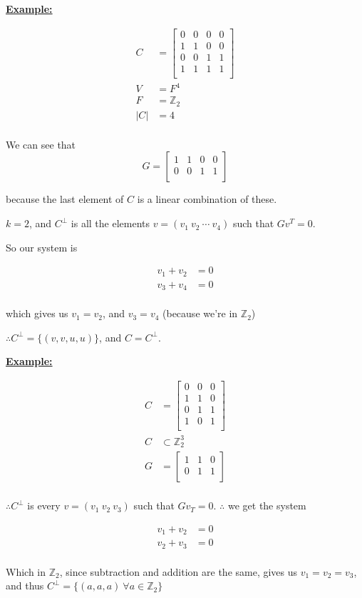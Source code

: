 \documentclass{article}
\renewcommand{\b}[1]{\textbf{#1}}
\newcommand{\ul}[1]{\underline{#1}}
\renewcommand{\aligned}[1]{
	\begin{align*}
		#1
	\end{align*}
}
\newcommand{\newdef}[2]{\b{\ul{#1:}} #2}
\begin{document}
\newdef{Example}{
	\aligned{
		C   & = \begin{bmatrix}
			0 & 0 & 0 & 0 \\
			1 & 1 & 0 & 0 \\
			0 & 0 & 1 & 1 \\
			1 & 1 & 1 & 1 \\
		\end{bmatrix} \\
		V   & = F^4                        \\
		F   & = \mathbb{Z}_2               \\
		|C| & = 4                          \\
	}

	We can see that
	\[G = \begin{bmatrix}
			1 & 1 & 0 & 0 \\
			0 & 0 & 1 & 1 \\
		\end{bmatrix}\]

	because the last element of $C$ is a linear combination of these.

	$k = 2$, and $C^\perp$ is all the elements
	$v = (v_1\ v_2\ \cdots\ v_4)$ such that $Gv^T = 0$.

	So our system is
	\aligned {
		v_1 + v_2 & = 0 \\
		v_3 + v_4 & = 0 \\
	}

	which gives us $v_1 = v_2$, and $v_3 = v_4$ (because we're in
	$\mathbb{Z}_2$)

	$\therefore C^\perp = \{(v,v, u, u)\}$, and $C = C^\perp$.
}

\newdef{Example}{
	\aligned {
		C & = \begin{bmatrix}
			0 & 0 & 0 \\
			1 & 1 & 0 \\
			0 & 1 & 1 \\
			1 & 0 & 1 \\
		\end{bmatrix} \\
		C & \subset \mathbb{Z}^3_2       \\
		G & = \begin{bmatrix}
			1 & 1 & 0 \\
			0 & 1 & 1 \\
		\end{bmatrix} \\
	}

	$\therefore C^\perp$ is every $v = (v_1\ v_2\ v_3)$ such that
	$Gv_T = 0$. $\therefore$ we get the system
	\aligned {
		v_1 + v_2 & = 0 \\
		v_2 + v_3 & =0  \\
	}
	Which in $\mathbb{Z}_2$, since subtraction and addition are the same,
	gives us $v_1 = v_2 = v_3$, and thus
	$C^\perp = \{ (a, a, a)\ \forall a \in \mathbb{Z}_2 \}$
}
\end{document}
